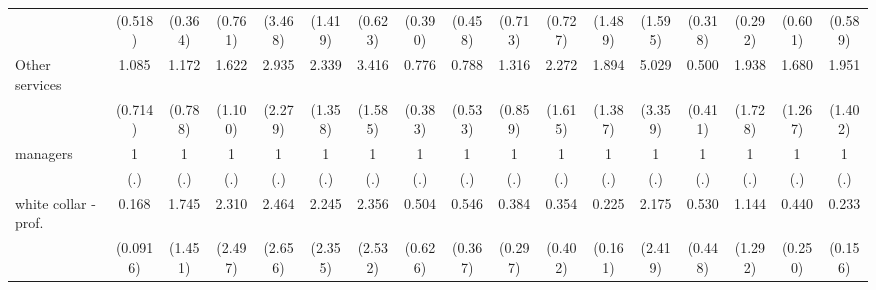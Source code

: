 {\begin{tabular}{l*{16}{c}}
                    &     (0.518)         &     (0.364)         &     (0.761)         &     (3.468)         &     (1.419)         &     (0.623)         &     (0.390)         &     (0.458)         &     (0.713)         &     (0.727)         &     (1.489)         &     (1.595)         &     (0.318)         &     (0.292)         &     (0.601)         &     (0.589)         \\
[1em]
Other services      &       1.085         &       1.172         &       1.622         &       2.935         &       2.339         &       3.416\sym{**} &       0.776         &       0.788         &       1.316         &       2.272         &       1.894         &       5.029\sym{*}  &       0.500         &       1.938         &       1.680         &       1.951         \\
                    &     (0.714)         &     (0.788)         &     (1.100)         &     (2.279)         &     (1.358)         &     (1.585)         &     (0.383)         &     (0.533)         &     (0.859)         &     (1.615)         &     (1.387)         &     (3.359)         &     (0.411)         &     (1.728)         &     (1.267)         &     (1.402)         \\
[1em]
managers            &           1         &           1         &           1         &           1         &           1         &           1         &           1         &           1         &           1         &           1         &           1         &           1         &           1         &           1         &           1         &           1         \\
                    &         (.)         &         (.)         &         (.)         &         (.)         &         (.)         &         (.)         &         (.)         &         (.)         &         (.)         &         (.)         &         (.)         &         (.)         &         (.)         &         (.)         &         (.)         &         (.)         \\
[1em]
white collar - prof.&       0.168\sym{**} &       1.745         &       2.310         &       2.464         &       2.245         &       2.356         &       0.504         &       0.546         &       0.384         &       0.354         &       0.225\sym{*}  &       2.175         &       0.530         &       1.144         &       0.440         &       0.233\sym{*}  \\
                    &    (0.0916)         &     (1.451)         &     (2.497)         &     (2.656)         &     (2.355)         &     (2.532)         &     (0.626)         &     (0.367)         &     (0.297)         &     (0.402)         &     (0.161)         &     (2.419)         &     (0.448)         &     (1.292)         &     (0.250)         &     (0.156)         \\

\end{tabular}}
